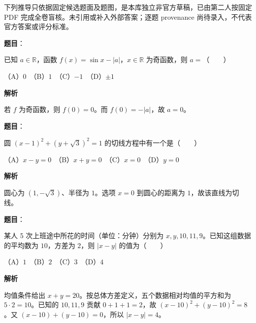 

\begin{gktip}
下列推导只依据固定候选题面及题图，是本库独立非官方草稿，已由第二人按固定 PDF 完成全卷盲核。未引用或补入外部答案；逐题 provenance 尚待录入，不代表官方答案或评分标准。
\end{gktip}

\begin{answer}

\textbf{题目}：

已知 $a\in\mathbb R$，函数 $f(x)=\sin x-|a|$，$x\in\mathbb R$ 为奇函数，则 $a=$\mbox{（　　）}

（A）$0$　（B）$1$　（C）$-1$　（D）$\pm1$

\textbf{解析}

若 $f$ 为奇函数，则 $f(0)=0$。而 $f(0)=-|a|$，故 $a=0$。


\end{answer}
\begin{answer}

\textbf{题目}：

圆 $(x-1)^2+(y+\sqrt3)^2=1$ 的切线方程中有一个是\mbox{（　　）}

（A）$x-y=0$　（B）$x+y=0$　（C）$x=0$　（D）$y=0$

\textbf{解析}

圆心为 $(1,-\sqrt3)$、半径为 $1$。选项 $x=0$ 到圆心的距离为 $1$，故该直线为切线。


\end{answer}
\begin{answer}

\textbf{题目}：

某人 5 次上班途中所花的时间（单位：分钟）分别为 $x,y,10,11,9$。已知这组数据的平均数为 $10$，方差为 $2$，则 $|x-y|$ 的值为\mbox{（　　）}

（A）$1$　（B）$2$　（C）$3$　（D）$4$

\textbf{解析}

均值条件给出 $x+y=20$。按总体方差定义，五个数据相对均值的平方和为 $5\cdot2=10$。已知的 $10,11,9$ 贡献 $0+1+1=2$，故 $(x-10)^2+(y-10)^2=8$。又 $(x-10)+(y-10)=0$，所以 $|x-y|=4$。


\end{answer}
